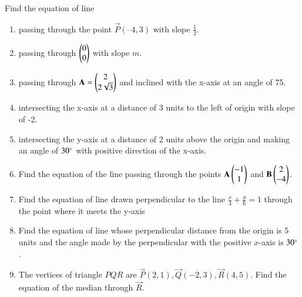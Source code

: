 Find the equation of line 
\begin{enumerate}[label=\thesubsection.\arabic*,ref=\thesubsection.\theenumi]
	\item passing through the point $\vec{P}(– 4, 3)$ with slope $\frac{1}{2}$.
\label{chapters/11/10/2/2}
\\
\solution

	\item passing through $\begin{pmatrix}0\\0\end{pmatrix}$ with slope $m$.\\
\label{chapters/11/10/2/3}
\solution

    \item passing through 
    $\mathbf{A} = \begin{pmatrix}2\\2\sqrt{3}\end{pmatrix}$ and inclined with the x-axis at an angle 
    of 75\textdegree.
\label{chapters/11/10/2/4}
\\
    \solution 

\item intersecting the x-axis at a distance of 3 units to the left of origin with slope of -2.
\label{chapters/11/10/2/5}
\\
\solution 

\item intersecting the y-axis at a distance of 2 units above the origin and making an
angle of $30\degree$ with positive direction of the x-axis.
\\
\solution 

\item Find the equation of the line passing through the points $\mathbf{A}\begin{pmatrix}-1\\1\end{pmatrix}$ and $\mathbf{B}\begin{pmatrix}2\\-4\end{pmatrix}$.
\\
\solution 

\item Find the equation of line  drawn perpendicular to the line $\frac{x}{4}+\frac{y}{6}=1$ through the point where it meets the y-axis \\
\solution
		
\item Find the equation of line whose perpendicular distance from the origin is 5 units and the angle made by the perpendicular with the positive $x$-axis is $30\degree$.
\label{chapters/11/10/2/8}
\\
\solution

\item 
The vertices of triangle $PQR$ are $\vec{P}(2,1), \vec{Q}(-2,3), \vec{R}(4,5)$. Find the equation of the median through $\vec{R}$.
\label{chapters/11/10/2/9}

\end{enumerate}
